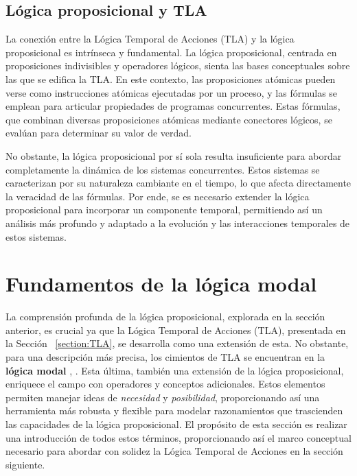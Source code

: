 \subsection{Lógica proposicional y TLA}\label{subsection:lpropTLA}
La conexión entre la Lógica Temporal de Acciones (TLA) y la lógica proposicional es intrínseca y fundamental. La lógica proposicional, centrada en proposiciones indivisibles y operadores lógicos, sienta las bases conceptuales sobre las que se edifica la TLA. En este contexto, las proposiciones atómicas pueden verse como instrucciones atómicas ejecutadas por un proceso, y las fórmulas se emplean para articular propiedades de programas concurrentes. Estas fórmulas, que combinan diversas proposiciones atómicas mediante conectores lógicos, se evalúan para determinar su valor de verdad.

No obstante, la lógica proposicional por sí sola resulta insuficiente para abordar completamente la dinámica de los sistemas concurrentes. Estos sistemas se caracterizan por su naturaleza cambiante en el tiempo, lo que afecta directamente la veracidad de las fórmulas. Por ende, se es necesario extender la lógica proposicional para incorporar un componente temporal, permitiendo así un análisis más profundo y adaptado a la evolución y las interacciones temporales de estos sistemas.

\section{Fundamentos de la lógica modal}\label{section:lmodal}
La comprensión profunda de la lógica proposicional, explorada en la sección anterior, es crucial ya que la Lógica Temporal de Acciones (TLA), presentada en la Sección ~\ref{section:TLA}, se desarrolla como una extensión de esta. No obstante, para una descripción más precisa, los cimientos de TLA se encuentran en la \textbf{lógica modal} \cite{jansana2003logicamodal}, \cite{Zach2019-ZACBAD}. Esta última, también una extensión de la lógica proposicional, enriquece el campo con operadores y conceptos adicionales. Estos elementos permiten manejar ideas de \textit{necesidad} y \textit{posibilidad}, proporcionando así una herramienta más robusta y flexible para modelar razonamientos que trascienden las capacidades de la lógica proposicional. El propósito de esta sección es realizar una introducción de todos estos términos, proporcionando así el marco conceptual necesario para abordar con solidez la Lógica Temporal de Acciones en la sección siguiente.

